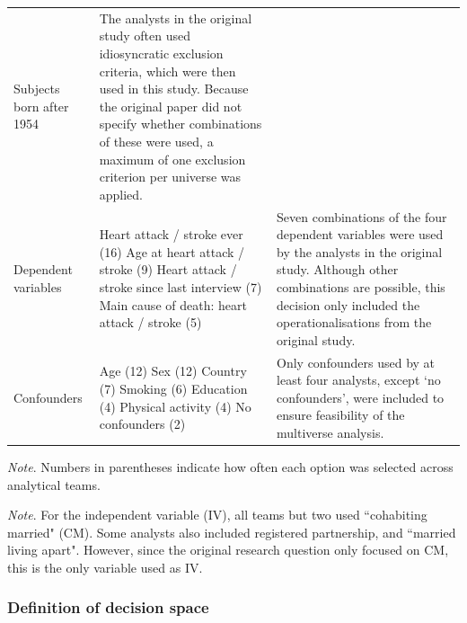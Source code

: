 \documentclass[
  letterpaper,
  DIV=11,
  numbers=noendperiod]{scrartcl}
\begin{document}
\begin{table}[htbp]
\begin{threeparttable}
\begin{tabularx}{\textwidth}{
>{\RaggedRight\arraybackslash}p{3.2cm}
>{\RaggedRight\arraybackslash}p{6.2cm}
>{\RaggedRight\arraybackslash}X
}
Subjects born after 1954
&
The analysts in the original study often used idiosyncratic exclusion criteria, which were then used in this study. Because the original paper did not specify whether combinations of these were used, a maximum of one exclusion criterion per universe was applied. \\
\addlinespace
Dependent variables &
Heart attack / stroke ever (16) \newline
Age at heart attack / stroke (9) \newline
Heart attack / stroke since last interview (7) \newline
Main cause of death: heart attack / stroke (5)
&
Seven combinations of the four dependent variables were used by the analysts in the original study. Although other combinations are possible, this decision only included the operationalisations from the original study. \\
\addlinespace
Confounders &
Age (12) \newline
Sex (12) \newline
Country (7) \newline
Smoking (6) \newline
Education (4) \newline
Physical activity (4) \newline
No confounders (2)
&
Only confounders used by at least four analysts, except `no confounders', were included to ensure feasibility of the multiverse analysis. \\
\bottomrule
\end{tabularx}
\begin{tablenotes}[flushleft]
\footnotesize
\item \textit{Note}. Numbers in parentheses indicate how often each option was selected across analytical teams.
\item \textit{Note}. For the independent variable (IV), all teams but two used ``cohabiting married" (CM). Some analysts also included registered partnership, and ``married living apart". However, since the original research question only focused on CM, this is the only variable used as IV.
\end{tablenotes}
\end{threeparttable}
\end{table}

\subsubsection{Definition of decision
space}\label{definition-of-decision-space}
\end{document}
